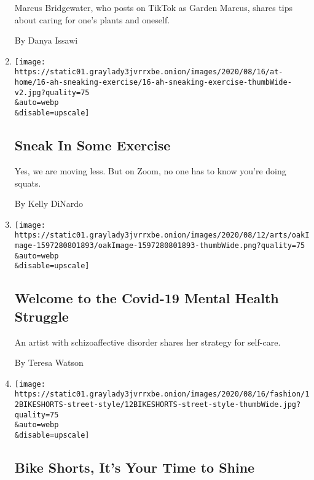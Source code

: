 \begin{enumerate}
  Marcus Bridgewater, who posts on TikTok as Garden Marcus, shares tips
  about caring for one's plants and oneself.

  By Danya Issawi
\item
  \href{/2020/08/15/at-home/coronavirus-at-home-quick-exercises.html}{}

  \texttt{[image: https://static01.graylady3jvrrxbe.onion/images/2020/08/16/at-home/16-ah-sneaking-exercise/16-ah-sneaking-exercise-thumbWide-v2.jpg?quality=75\\\&auto=webp\\\&disable=upscale]}

  \hypertarget{sneak-in-some-exercise}{%
  \subsection{Sneak In Some Exercise}\label{sneak-in-some-exercise}}

  Yes, we are moving less. But on Zoom, no one has to know you're doing
  squats.

  By Kelly DiNardo
\item
  \href{/2020/08/14/arts/covid-diary-mental-health.html}{}

  \texttt{[image: https://static01.graylady3jvrrxbe.onion/images/2020/08/12/arts/oakImage-1597280801893/oakImage-1597280801893-thumbWide.png?quality=75\\\&auto=webp\\\&disable=upscale]}

  \hypertarget{welcome-to-the-covid-19-mental-health-struggle}{%
  \subsection{Welcome to the Covid-19 Mental Health
  Struggle}\label{welcome-to-the-covid-19-mental-health-struggle}}

  An artist with schizoaffective disorder shares her strategy for
  self-care.

  By Teresa Watson
\item
  \href{/2020/08/12/style/bike-shorts-pandemic-quarantine.html}{}

  \texttt{[image: https://static01.graylady3jvrrxbe.onion/images/2020/08/16/fashion/12BIKESHORTS-street-style/12BIKESHORTS-street-style-thumbWide.jpg?quality=75\\\&auto=webp\\\&disable=upscale]}

  \hypertarget{bike-shorts-its-your-time-to-shine}{%
  \subsection{Bike Shorts, It's Your Time to
  Shine}\label{bike-shorts-its-your-time-to-shine}}


\end{enumerate}
